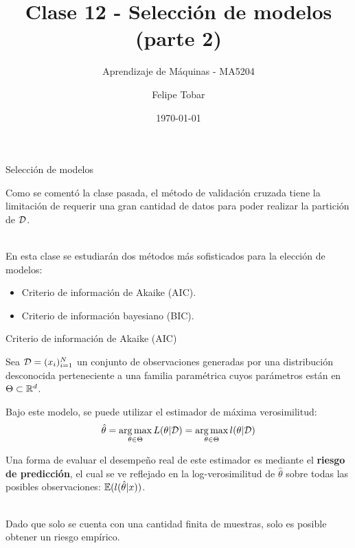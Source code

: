 \documentclass[9pt]{beamer}
\title{Clase 12 - Selección de modelos (parte 2)}
\subtitle{Aprendizaje de Máquinas - MA5204}
\date{\today}
\author{Felipe Tobar}
\institute{Department of Mathematical Engineering \&\\ Center for Mathematical Modelling\\Universidad de Chile}
\begin{document}
\begin{frame}
  \titlepage
\end{frame}

\begin{frame}{Selección de modelos}

Como se comentó la clase pasada, el método de validación cruzada tiene la limitación de requerir una gran cantidad de datos para poder realizar la partición de ${\mathcal D}$.\\~\ \pause

En esta clase se estudiarán dos métodos más sofisticados para la elección de modelos:

\begin{itemize}
	\item Criterio de información de Akaike (AIC).
	\item Criterio de información bayesiano (BIC).
\end{itemize}
	
\end{frame}


\begin{frame}{Criterio de información de Akaike (AIC)}

Sea ${\mathcal D}=(x_i)_{i=1}^N$ un conjunto de observaciones generadas por una distribución desconocida perteneciente a una familia paramétrica cuyos parámetros están en $\Theta\subset\mathbb{R}^d$.\\ \pause

Bajo este modelo, se puede utilizar el estimador de máxima verosimilitud:
\begin{equation*}
	\hat{\theta} = \operatorname*{arg\,max}_{\theta\in\Theta} L(\theta|{\mathcal D}) =  \operatorname*{arg\,max}_{\theta\in\Theta} l(\theta|{\mathcal D})
\end{equation*}

Una forma de evaluar el desempeño real de este estimador es mediante el \textbf{riesgo de predicción}, el cual se ve reflejado en la log-verosimilitud de $\hat{\theta}$ sobre todas las posibles observaciones: $\operatorname{\mathbb{E}}(l(\hat{\theta}|x))$.\\~\ \pause

Dado que solo se cuenta con una cantidad finita de muestras, solo es posible obtener un riesgo empírico.\\

\end{frame}
\end{document}
